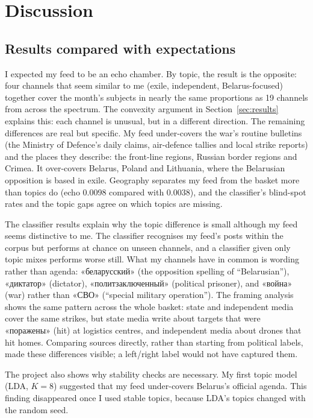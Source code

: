 \documentclass[11pt,a4paper]{article}
\newcommand{\ru}[2]{«#1» (#2)}
\begin{document}
\section{Discussion}
\label{sec:discussion}

\subsection{Results compared with expectations}
I expected my feed to be an echo chamber. By topic, the result is the opposite: four channels that seem similar to me (exile, independent, Belarus-focused) together cover the month's subjects in nearly the same proportions as 19 channels from across the spectrum. The convexity argument in Section~\ref{sec:results} explains this: each channel is unusual, but in a different direction. The remaining differences are real but specific. My feed under-covers the war's routine bulletins (the Ministry of Defence's daily claims, air-defence tallies and local strike reports) and the places they describe: the front-line regions, Russian border regions and Crimea. It over-covers Belarus, Poland and Lithuania, where the Belarusian opposition is based in exile. Geography separates my feed from the basket more than topics do (echo 0.0098 compared with 0.0038), and the classifier's blind-spot rates and the topic gaps agree on which topics are missing.

The classifier results explain why the topic difference is small although my feed seems distinctive to me. The classifier recognises my feed's posts within the corpus but performs at chance on unseen channels, and a classifier given only topic mixes performs worse still. What my channels have in common is wording rather than agenda: «беларусский» (the opposition spelling of ``Belarusian''), \ru{диктатор}{dictator}, \ru{политзаключенный}{political prisoner}, and \ru{война}{war} rather than \ru{СВО}{``special military operation''}. The framing analysis shows the same pattern across the whole basket: state and independent media cover the same strikes, but state media write about targets that were «поражены» (hit) at logistics centres, and independent media about drones that hit homes. Comparing sources directly, rather than starting from political labels, made these differences visible; a left/right label would not have captured them.

The project also shows why stability checks are necessary. My first topic model (LDA, $K=8$) suggested that my feed under-covers Belarus's official agenda. This finding disappeared once I used stable topics, because LDA's topics changed with the random seed.
\end{document}

